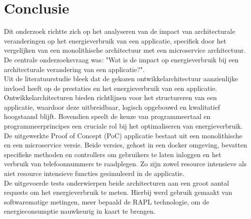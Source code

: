 
\chapter{Conclusie}%
\label{ch:conclusie}


Dit onderzoek richtte zich op het analyseren van de impact van architecturale veranderingen op het energieverbruik van een applicatie, specifiek door het vergelijken van een monolithische architectuur met een microservice architectuur. De centrale onderzoeksvraag was: "Wat is de impact op energieverbruik bij een architecturale verandering van een applicatie?".\\

Uit de literatuurstudie bleek dat de gekozen ontwikkelarchitectuur aanzienlijke invloed heeft op de prestaties en het energieverbruik van een applicatie. Ontwikkelarchitecturen bieden richtlijnen voor het structureren van een applicatie, waardoor deze uitbreidbaar, logisch opgebouwd en kwalitatief hoogstaand blijft. Bovendien speelt de keuze van programmeertaal en programmeerprincipes een cruciale rol bij het optimaliseren van energieverbruik.\\

De uitgewerkte Proof of Concept (PoC) applicatie bestaat uit een monolithische en een microservice versie. Beide versies, gehost in een docker omgeving, bevatten specifieke methoden en controllers om gebruikers te laten inloggen en het verbruik van telefoonnummers te raadplegen. Zo zijn zowel resource intensieve als niet resource intensieve functies gesimuleerd in de applicatie.\\

De uitgevoerde tests onderwierpen beide architecturen aan een groot aantal requests om het energieverbruik te meten. Hierbij werd gebruik gemaakt van softwarematige metingen, meer bepaald de RAPL technologie, om de energieconsumptie nauwkeurig in kaart te brengen.\\

